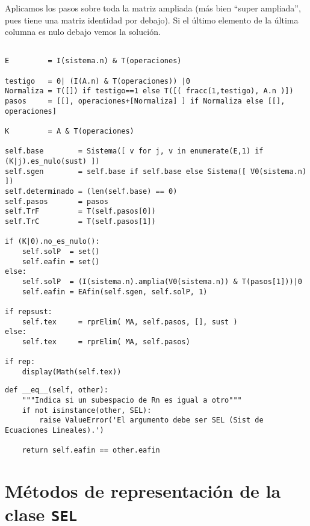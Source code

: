 \documentclass[11pt]{report}
\begin{document}
Aplicamos los pasos sobre toda la matriz ampliada (más bien ``super
ampliada'', pues tiene una matriz identidad por debajo). Si el último
elemento de la última columna es nulo debajo vemos la solución.

\begin{verbatim}

E         = I(sistema.n) & T(operaciones)

testigo   = 0| (I(A.n) & T(operaciones)) |0
Normaliza = T([]) if testigo==1 else T([( fracc(1,testigo), A.n )])
pasos     = [[], operaciones+[Normaliza] ] if Normaliza else [[], operaciones]

K         = A & T(operaciones)

self.base        = Sistema([ v for j, v in enumerate(E,1) if (K|j).es_nulo(sust) ])
self.sgen        = self.base if self.base else Sistema([ V0(sistema.n) ])
self.determinado = (len(self.base) == 0)
self.pasos       = pasos 
self.TrF         = T(self.pasos[0]) 
self.TrC         = T(self.pasos[1])

if (K|0).no_es_nulo():
    self.solP  = set()
    self.eafin = set()
else:
    self.solP  = (I(sistema.n).amplia(V0(sistema.n)) & T(pasos[1]))|0 
    self.eafin = EAfin(self.sgen, self.solP, 1)

if repsust:
    self.tex     = rprElim( MA, self.pasos, [], sust )
else:
    self.tex     = rprElim( MA, self.pasos)

if rep:
    display(Math(self.tex))           

\end{verbatim}

\begin{verbatim}
def __eq__(self, other):
    """Indica si un subespacio de Rn es igual a otro"""
    if not isinstance(other, SEL):
        raise ValueError('El argumento debe ser SEL (Sist de Ecuaciones Lineales).')
    
    return self.eafin == other.eafin
\end{verbatim}

\section{Métodos de representación de la clase \texttt{SEL}}
\label{sec:org451ba17}
\end{document}
